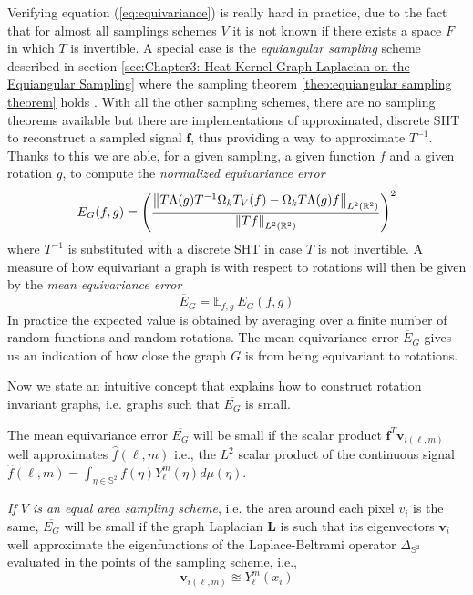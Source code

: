 Verifying equation (\ref{eq:equivariance}) is really hard in practice, due to the fact that for almost all samplings schemes $V$ it is not known if there exists a space $F$ in which $T$ is invertible. A special case is the \textit{equiangular sampling} scheme described in section \ref{sec:Chapter3: Heat Kernel Graph Laplacian on the Equiangular Sampling} where the sampling theorem \ref{theo:equiangular sampling theorem} holds \cite{Driscoll:1994:CFT:184069.184073}. With all the other sampling schemes, there are no sampling theorems available but there are implementations of approximated, discrete SHT to reconstruct a sampled signal $\mathbf f$, thus providing a way to approximate $T^{-1}$. Thanks to this we are able, for a given sampling, a given function $f$ and a given rotation $g$, to compute the \textit{normalized equivariance error} 
\begin{equation}\label{eq:equivariance error}
	E_{G}(f, g) = \left(\frac{ \left\lVert T \Lambda(g) T^{-1} \Omega_k T_V(f) - \Omega_k T \Lambda(g) f\right\rVert_{L^2(\mathbb R^2)}}{\left\lVert Tf\right\rVert_{L^2(\mathbb R^2)}}\right)^2
\end{equation}
where $T^{-1}$ is substituted with a discrete SHT in case $T$ is not invertible.
A measure of how equivariant a graph is with respect to rotations will then be given by the \textit{mean equivariance error}
\begin{equation}\label{eq:mean equivariance error}
\overline E_G = \mathbb E_{f, g}\ 	E_G(f, g) 
\end{equation}
In practice the expected value is obtained by averaging over a finite number of random functions and random rotations. The mean equivariance error $\overline E_G$ gives us an indication of how close the graph $G$ is from being equivariant to rotations.

Now we state an intuitive concept that explains how to construct rotation invariant graphs, i.e. graphs such that $\overline{E_G}$ is small.
\begin{snugshade*}
The mean equivariance error $\overline{E_G}$ will be small if the scalar product $\mathbf f^T \mathbf v_{i(\ell, m)}$ well approximates $\hat {f}(\ell,m)$ i.e., the $L^2$ scalar product of the continuous signal \\
$\hat {f}(\ell,m)= \int_{\eta \in \mathbb S^2}f(\eta)Y_\ell^m(\eta)d\mu(\eta)$.

\textit{If $V$ is an equal area sampling scheme}, i.e. the area around each pixel $v_i$ is the same, $\overline{E_G}$ will be small if the graph Laplacian $\mathbf L$ is such that its eigenvectors $\mathbf v_i$ well approximate the eigenfunctions of the Laplace-Beltrami operator $\Delta_{\mathbb S^2}$ evaluated in the points of the sampling scheme, i.e., 
$$
\mathbf v_{i(\ell, m)} \approxeq Y_\ell^m(x_i)
$$
\end{snugshade*}

